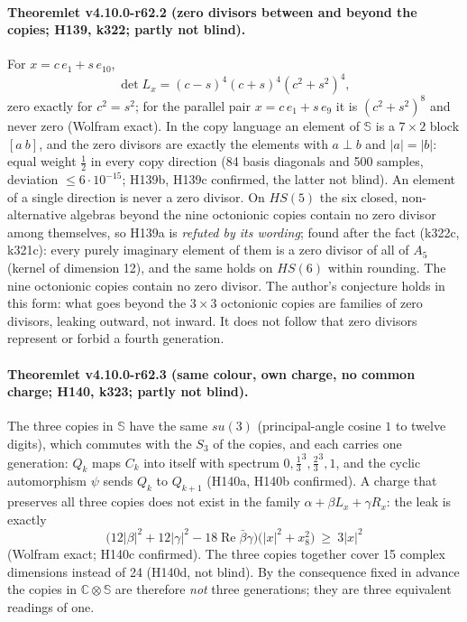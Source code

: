 \paragraph{Theoremlet v4.10.0-r62.2 (zero divisors between and beyond the copies; H139, k322; partly not blind).}
For \(x=c\,e_1+s\,e_{10}\),
\[
\det L_x=(c-s)^4(c+s)^4(c^2+s^2)^4 ,
\]
zero exactly for \(c^2=s^2\); for the parallel pair \(x=c\,e_1+s\,e_9\) it is \((c^2+s^2)^8\) and never zero (Wolfram exact).  In the copy
language an element of \(\mathbb S\) is a \(7\times2\) block \([a\ b]\), and the zero divisors are exactly the elements with \(a\perp b\) and
\(|a|=|b|\): equal weight \(\tfrac12\) in every copy direction (84 basis diagonals and 500 samples, deviation \(\le6\cdot10^{-15}\); H139b, H139c
confirmed, the latter not blind).  An element of a single direction is never a zero divisor.  On \(HS(5)\) the six closed, non-alternative
algebras beyond the nine octonionic copies contain no zero divisor among themselves, so H139a is \emph{refuted by its wording}; found after the
fact (k322c, k321c): every purely imaginary element of them is a zero divisor of all of \(A_5\) (kernel of dimension 12), and the same holds on
\(HS(6)\) within rounding.  The nine octonionic copies contain no zero divisor.  The author's conjecture holds in this form: what goes beyond the
\(3\times3\) octonionic copies are families of zero divisors, leaking outward, not inward.  It does not follow that zero divisors represent or
forbid a fourth generation.

\paragraph{Theoremlet v4.10.0-r62.3 (same colour, own charge, no common charge; H140, k323; partly not blind).}
The three copies in \(\mathbb S\) have the same \(su(3)\) (principal-angle cosine \(1\) to twelve digits), which commutes with the \(S_3\) of the
copies, and each carries one generation: \(Q_k\) maps \(C_k\) into itself with spectrum \(0,\tfrac13^3,\tfrac23^3,1\), and the cyclic automorphism
\(\psi\) sends \(Q_k\) to \(Q_{k+1}\) (H140a, H140b confirmed).  A charge that preserves all three copies does not exist in the family
\(\alpha+\beta L_x+\gamma R_x\): the leak is exactly
\[
\bigl(12|\beta|^2+12|\gamma|^2-18\operatorname{Re}\bar\beta\gamma\bigr)\bigl(|x|^2+x_8^2\bigr)\ \ge\ 3|x|^2
\]
(Wolfram exact; H140c confirmed).  The three copies together cover 15 complex dimensions instead of 24 (H140d, not blind).  By the consequence
fixed in advance the copies in \(\mathbb C\otimes\mathbb S\) are therefore \emph{not} three generations; they are three equivalent readings of one.

